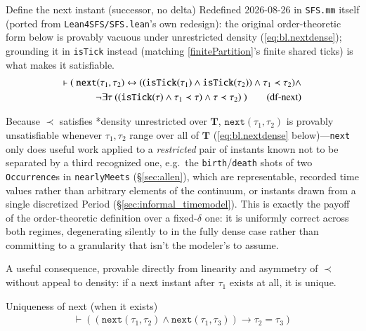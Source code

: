 \begin{definition} {Define the next instant (successor, no delta)} Redefined 2026-08-26 in
\texttt{SFS.mm} itself (ported from \texttt{Lean4SFS/SFS.lean}'s own redesign): the original order-theoretic
form below is provably vacuous under unrestricted density (\ref{eq:bl.nextdense}); grounding it in
\texttt{isTick} instead (matching \ref{finitePartition}'s finite shared ticks) is what makes it satisfiable.
\begin{align}
\vdash (~ \texttt{next}( \tau_1, \tau_2 ) \leftrightarrow ( ( \texttt{isTick}(\tau_1) \wedge \texttt{isTick}(\tau_2) ) \wedge \tau_1 \prec \tau_2 ) \wedge \notag \\
~\lnot \exists \tau~( ( \texttt{isTick}(\tau) \wedge \tau_1 \prec \tau ) \wedge \tau \prec \tau_2 )~)
    \label{eq:df-next}\tag{df-next}
\end{align}
\end{definition}

\pn Because $\prec$ satisfies *density unrestricted over $\mathbf{T}$, $\texttt{next}(\tau_1,\tau_2)$ is
provably unsatisfiable whenever $\tau_1,\tau_2$ range over all of $\mathbf{T}$
(\ref{eq:bl.nextdense} below)---\texttt{next} only does useful work applied to a \emph{restricted} pair
of instants known not to be separated by a third recognized one, e.g.\ the \texttt{birth}/\texttt{death}
shots of two \texttt{Occurrence}s in \texttt{nearlyMeets} (\S\ref{sec:allen}), which are representable,
recorded time values rather than arbitrary elements of the continuum, or instants drawn from a single
discretized Period (\S\ref{sec:informal_timemodel}).  This is exactly the payoff of the order-theoretic
definition over a fixed-$\delta$ one: it is uniformly correct across both regimes, degenerating silently
to  in the fully dense case rather than committing to a granularity that isn't the
modeler's to assume.

\pn A useful consequence, provable directly from linearity and asymmetry of $\prec$ without appeal to
density: if a next instant after $\tau_1$ exists at all, it is unique.

\begin{lemma} {Uniqueness of next (when it exists)}
\begin{align}
\vdash ( ( \texttt{next}( \tau_1, \tau_2 ) \wedge \texttt{next}( \tau_1, \tau_3 ) ) \rightarrow \tau_2 =
    \tau_3 )\label{eq:bl.nextuniq}\tag{bl.nextuniq}
\end{align}
\end{lemma}


